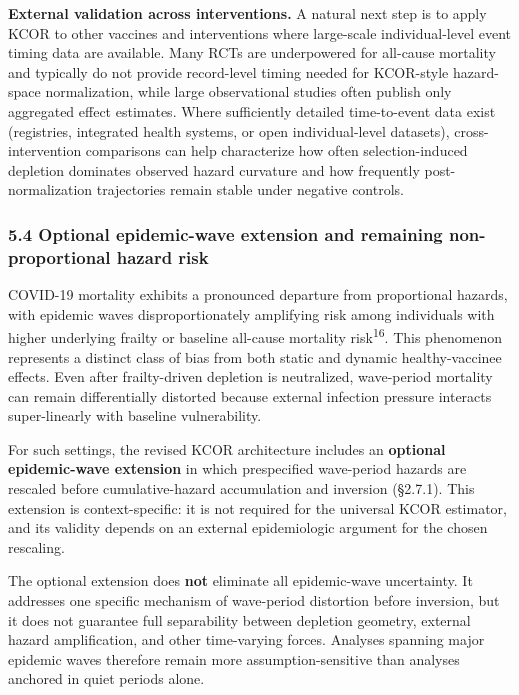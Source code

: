 \documentclass[
]{article}
\begin{document}
\textbf{External validation across interventions.} A natural next step
is to apply KCOR to other vaccines and interventions where large-scale
individual-level event timing data are available. Many RCTs are
underpowered for all-cause mortality and typically do not provide
record-level timing needed for KCOR-style hazard-space normalization,
while large observational studies often publish only aggregated effect
estimates. Where sufficiently detailed time-to-event data exist
(registries, integrated health systems, or open individual-level
datasets), cross-intervention comparisons can help characterize how
often selection-induced depletion dominates observed hazard curvature
and how frequently post-normalization trajectories remain stable under
negative controls.

\subsubsection{5.4 Optional epidemic-wave extension and remaining
non-proportional hazard
risk}\label{optional-epidemic-wave-extension-and-remaining-non-proportional-hazard-risk}

COVID-19 mortality exhibits a pronounced departure from proportional
hazards, with epidemic waves disproportionately amplifying risk among
individuals with higher underlying frailty or baseline all-cause
mortality risk\textsuperscript{16}. This phenomenon represents a
distinct class of bias from both static and dynamic healthy-vaccinee
effects. Even after frailty-driven depletion is neutralized, wave-period
mortality can remain differentially distorted because external infection
pressure interacts super-linearly with baseline vulnerability.

For such settings, the revised KCOR architecture includes an
\textbf{optional epidemic-wave extension} in which prespecified
wave-period hazards are rescaled before cumulative-hazard accumulation
and inversion (§2.7.1). This extension is context-specific: it is not
required for the universal KCOR estimator, and its validity depends on
an external epidemiologic argument for the chosen rescaling.

The optional extension does \textbf{not} eliminate all epidemic-wave
uncertainty. It addresses one specific mechanism of wave-period
distortion before inversion, but it does not guarantee full separability
between depletion geometry, external hazard amplification, and other
time-varying forces. Analyses spanning major epidemic waves therefore
remain more assumption-sensitive than analyses anchored in quiet periods
alone.
\end{document}
